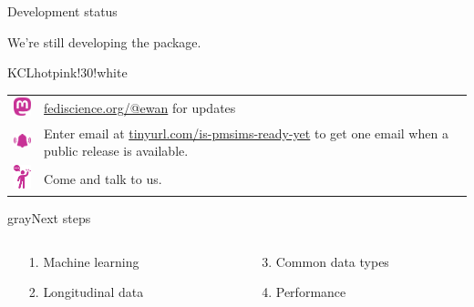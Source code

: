 \documentclass[11pt]{beamer}
\begin{document}
\begin{frame}[t]{Development status}

	We're still developing the package.


	\begin{cbox}[colframe=KCLhotpink!50!white]{KCLhotpink!30!white}{}

		\begin{tabular}{cp{}}
			\includegraphics[width=2em,valign=c]{figures/mastodon.pdf} &
			\href{https://fediscience.org/@ewan}{\textcolor{KCLhotpink}{fediscience.org/@ewan}}
			for updates                                                  \\[1.6em]
			\includegraphics[width=2em,valign=c]{figures/bell.pdf}     &
			Enter email at
			\href{https://tinyurl.com/is-pmsims-ready-yet}{\textcolor{KCLhotpink}{tinyurl.com/is-pmsims-ready-yet}}
			to get one email when a public release is available.         \\[1.6em]
			\includegraphics[width=2em,valign=c]{figures/hi.pdf}       &
			Come and talk to us.
		\end{tabular}
	\end{cbox}

	\begin{cbox}{gray}{Next steps}
		\begin{columns}
			\begin{column}[T]{0.45\textwidth}
				\begin{enumerate}
					\item[1.] \textcolor{KCLpurple}{Machine learning}
					\item[2.] \textcolor{KCLpurple}{Longitudinal data}
				\end{enumerate}
			\end{column}
			\begin{column}[T]{0.45\textwidth}
				\begin{enumerate}
					\item[3.] \textcolor{KCLpurple}{Common data types}
					\item[4.] \textcolor{KCLpurple}{Performance}
				\end{enumerate}
			\end{column}
		\end{columns}
	\end{cbox}


\end{frame}
\end{document}
